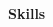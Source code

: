 \noindent\textbf{Skills}
\noindent\hrulefill
\vspace{0.25em}
\begin{adjustwidth}{1.5em}{0em}

\end{adjustwidth}
\vspace{0.25em}